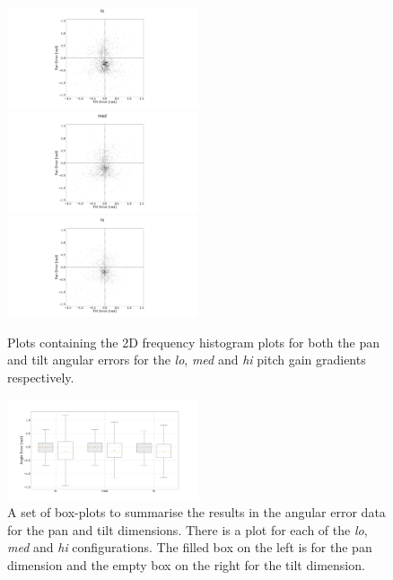 \documentclass[format=sigconf, review=true, screen=true, anonymous=true]{acmart}
\begin{document}
\begin{figure}
  \centering
  \includegraphics[width=0.5\textwidth]{figures/err_lo.png}
  \includegraphics[width=0.5\textwidth]{figures/err_med.png}
  \includegraphics[width=0.5\textwidth]{figures/err_hi.png}
  \caption{Plots containing the 2D frequency histogram plots for both the pan and tilt angular errors for the \emph{lo}, \emph{med} and \emph{hi} pitch gain gradients respectively. }
  \label{fig:err-results}
\end{figure}

\begin{figure}
  \centering
  \includegraphics[width=0.5\textwidth]{figures/err_boxplot.png}
  \caption{A set of box-plots to summarise the results in the angular error data for the pan and tilt dimensions. There is a plot for each of the \emph{lo}, \emph{med} and \emph{hi} configurations. The filled box on the left is for the pan dimension and the empty box on the right for the tilt dimension. }
  \label{fig:err-boxplots}
\end{figure}
\end{document}
